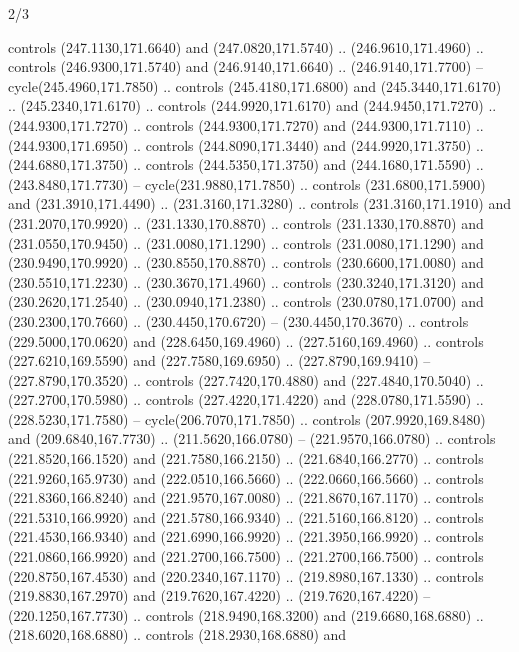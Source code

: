 \begin{flagdescription}{2/3}
\begin{scope}[xshift=0.5\flaglength,yshift=0.5\flagwidth,scale=\flagwidth/259.2]
\begin{scope}[y=0.8pt, x=0.8pt, yscale=-1,shift={(-243,-162)}]
      controls (247.1130,171.6640) and (247.0820,171.5740) .. (246.9610,171.4960) ..
      controls (246.9300,171.5740) and (246.9140,171.6640) .. (246.9140,171.7700) --
      cycle(245.4960,171.7850) .. controls (245.4180,171.6800) and
      (245.3440,171.6170) .. (245.2340,171.6170) .. controls (244.9920,171.6170) and
      (244.9450,171.7270) .. (244.9300,171.7270) .. controls (244.9300,171.7270) and
      (244.9300,171.7110) .. (244.9300,171.6950) .. controls (244.8090,171.3440) and
      (244.9920,171.3750) .. (244.6880,171.3750) .. controls (244.5350,171.3750) and
      (244.1680,171.5590) .. (243.8480,171.7730) -- cycle(231.9880,171.7850) ..
      controls (231.6800,171.5900) and (231.3910,171.4490) .. (231.3160,171.3280) ..
      controls (231.3160,171.1910) and (231.2070,170.9920) .. (231.1330,170.8870) ..
      controls (231.1330,170.8870) and (231.0550,170.9450) .. (231.0080,171.1290) ..
      controls (231.0080,171.1290) and (230.9490,170.9920) .. (230.8550,170.8870) ..
      controls (230.6600,171.0080) and (230.5510,171.2230) .. (230.3670,171.4960) ..
      controls (230.3240,171.3120) and (230.2620,171.2540) .. (230.0940,171.2380) ..
      controls (230.0780,171.0700) and (230.2300,170.7660) .. (230.4450,170.6720) --
      (230.4450,170.3670) .. controls (229.5000,170.0620) and (228.6450,169.4960) ..
      (227.5160,169.4960) .. controls (227.6210,169.5590) and (227.7580,169.6950) ..
      (227.8790,169.9410) -- (227.8790,170.3520) .. controls (227.7420,170.4880) and
      (227.4840,170.5040) .. (227.2700,170.5980) .. controls (227.4220,171.4220) and
      (228.0780,171.5590) .. (228.5230,171.7580) -- cycle(206.7070,171.7850) ..
      controls (207.9920,169.8480) and (209.6840,167.7730) .. (211.5620,166.0780) --
      (221.9570,166.0780) .. controls (221.8520,166.1520) and (221.7580,166.2150) ..
      (221.6840,166.2770) .. controls (221.9260,165.9730) and (222.0510,166.5660) ..
      (222.0660,166.5660) .. controls (221.8360,166.8240) and (221.9570,167.0080) ..
      (221.8670,167.1170) .. controls (221.5310,166.9920) and (221.5780,166.9340) ..
      (221.5160,166.8120) .. controls (221.4530,166.9340) and (221.6990,166.9920) ..
      (221.3950,166.9920) .. controls (221.0860,166.9920) and (221.2700,166.7500) ..
      (221.2700,166.7500) .. controls (220.8750,167.4530) and (220.2340,167.1170) ..
      (219.8980,167.1330) .. controls (219.8830,167.2970) and (219.7620,167.4220) ..
      (219.7620,167.4220) -- (220.1250,167.7730) .. controls (218.9490,168.3200) and
      (219.6680,168.6880) .. (218.6020,168.6880) .. controls (218.2930,168.6880) and

\end{scope}
\end{scope}
\end{flagdescription}
